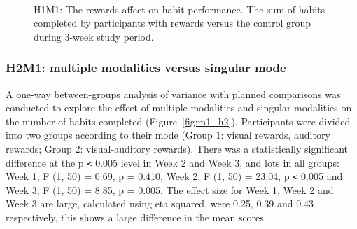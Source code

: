 \begin{figure}[H]
\centering
  \caption{H1M1: The rewards affect on habit performance. The sum of habits completed by participants with rewards versus the control group during 3-week study period.}~\label{fig:m1_h1}
\end{figure}

\subsubsection*{H2M1: multiple modalities versus singular mode}
A one-way between-groups analysis of variance with planned comparisons was conducted to explore the effect of multiple modalities and singular modalities on the number of habits completed (Figure~\ref{fig:m1_h2}). Participants were divided into two groups according to their mode (Group 1: visual rewards, auditory rewards; Group 2: visual-auditory rewards). There was a statistically significant difference at the p \verb|<| 0.005 level in Week 2 and Week 3, and lots in all groups: Week 1, F (1, 50) = 0.69, p = 0.410, Week 2, F (1, 50) = 23.04, p \verb|<| 0.005 and Week 3, F (1, 50) = 8.85, p = 0.005. The effect size for Week 1, Week 2 and Week 3 are large, calculated using eta squared, were 0.25, 0.39 and 0.43 respectively, this shows a large difference in the mean scores.

